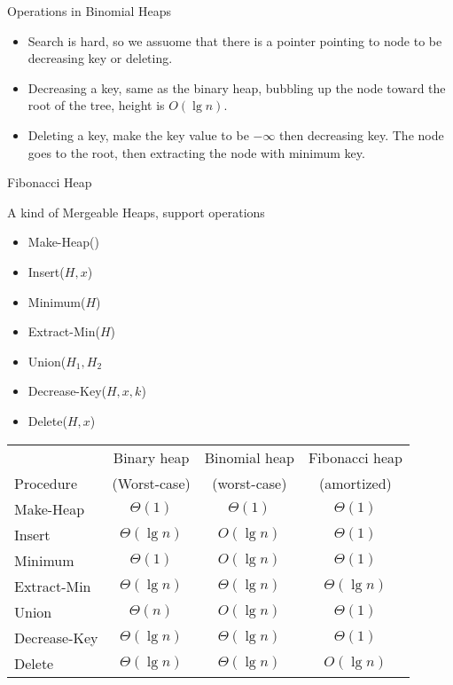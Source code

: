 \documentclass{beamer}
\begin{document}
\begin{frame}{}
\centerline{\large Operations in Binomial Heaps}
\vspace{0.5cm}
\begin{itemize}
\item {\sc Search} is hard, so we assuome that there is a pointer pointing to node to be decreasing key or deleting. 
\item Decreasing a key, same as the binary heap, bubbling up the node toward the root of the tree, height is $O(\lg n)$. 
\item Deleting a key, make the key value to be $-\infty$ then decreasing key. The node goes to the root, then extracting
 the node with minimum key. 
\end{itemize}
\end{frame}

\begin{frame}{Fibonacci Heap}

A kind of Mergeable Heaps, support operations
\begin{itemize}
\item {\sc Make-Heap()}
\item {\sc Insert($H,x$)}
\item {\sc Minimum($H$)}
\item {\sc Extract-Min($H$)}
\item {\sc Union($H_1,H_2$}
\item {\sc Decrease-Key($H,x,k$)}
\item {\sc Delete($H,x$)}
\end{itemize}
\end{frame}

\begin{frame}{}
\begin{table} 
\begin{tabular}{lccc}
			&Binary heap	&Binomial heap & Fibonacci heap \\
Procedure        	&   (Worst-case) 	&   (worst-case) 	&  (amortized)\\
\hline
 {\sc Make-Heap }	& $\Theta(1)$                 	& $\Theta(1)$                   	& $\Theta(1)$ \\
{\sc Insert}     	& $\Theta(\lg n)$ 			& $O(\lg n)$ 				& $\Theta(1)$ \\
{\sc Minimum} 	& $\Theta(1)$ 				& $O(\lg n)$ 		 		& $\Theta(1)$  \\
{\sc Extract-Min} & $\Theta(\lg n)$				& $\Theta(\lg n)$ 	 		& $\Theta(\lg n)$ \\
{\sc Union} 	& $\Theta(n)$ 				& $O(\lg n)$ 	 			& $\Theta(1)$  \\
{\sc Decrease-Key} & $\Theta(\lg n)$ 			& $\Theta(\lg n)$  			& $\Theta(1)$  \\
{\sc Delete} 	& $\Theta(\lg n)$ 			& $\Theta(\lg n)$ 			& $O(\lg n)$  \\
\end{tabular}
\end{table}
\end{frame}
\end{document}
